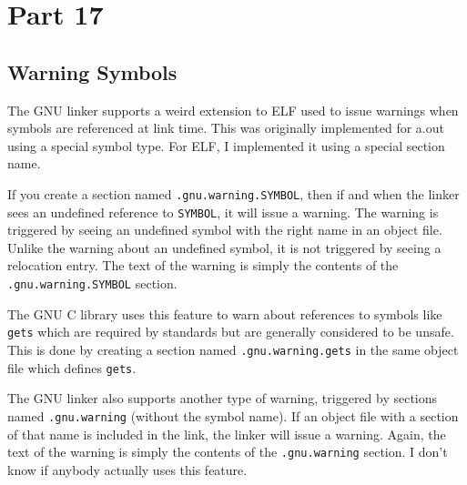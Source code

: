 \section{Part 17}

\subsection{Warning Symbols}

The GNU linker supports a weird extension to ELF used to issue warnings when
symbols are referenced at link time. This was originally implemented for a.out
using a special symbol type. For ELF, I implemented it using a special section
name.

If you create a section named \texttt{.gnu.warning.SYMBOL}, then if and when
the linker sees an undefined reference to \texttt{SYMBOL}, it will issue a
warning. The warning is triggered by seeing an undefined symbol with the right
name in an object file. Unlike the warning about an undefined symbol, it is not
triggered by seeing a relocation entry. The text of the warning is simply the
contents of the \texttt{.gnu.warning.SYMBOL} section.

The GNU C library uses this feature to warn about references to symbols like
\texttt{gets} which are required by standards but are generally considered to
be unsafe. This is done by creating a section named \texttt{.gnu.warning.gets}
in the same object file which defines \texttt{gets}.

The GNU linker also supports another type of warning, triggered by sections
named \texttt{.gnu.warning} (without the symbol name). If an object file
with a section of that name is included in the link, the linker will issue
a warning. Again, the text of the warning is simply the contents of the
\texttt{.gnu.warning} section. I don't know if anybody actually uses this
feature.
